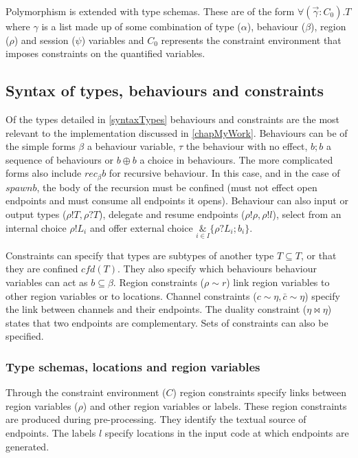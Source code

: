 Polymorphism is extended with type schemas. These are of the form $\forall(\overrightarrow{\gamma}:C_0).T$ where $\gamma$ is a list made up of some combination of type ($\alpha$), behaviour ($\beta$), region ($\rho$) and session ($\psi$) variables and $C_0$ represents the constraint environment that imposes constraints on the quantified variables. 

\subsection{Syntax of types, behaviours and constraints}

Of the types detailed in \ref{syntaxTypes} behaviours and constraints are the most relevant to the implementation discussed in \ref{chapMyWork}. Behaviours can be of the simple forms $\beta$ a behaviour variable, $\tau$ the behaviour with no effect, $b;b$ a sequence of behaviours or $b \oplus b$ a choice in behaviours. The more complicated forms also include $rec_\beta b$ for recursive behaviour. In this case, and in the case of $spawn b$, the body of the recursion must be confined (must not effect open endpoints and must consume all endpoints it opens). Behaviour can also input or output types ($\rho!T, \rho?T$), delegate and resume endpoints ($\rho!\rho, \rho!l$), select from an internal choice $\rho ! L_i$ and offer external choice $\underset{i \in I}{\&}\{\rho?L_i ; b_i\}$.

Constraints can specify that types are subtypes of another type $T\subseteq T$, or that they are confined $cfd(T)$. They also specify which behaviours behaviour variables can act as $b\subseteq \beta$. Region constraints ($\rho \sim r$) link region variables to other region variables or to locations. Channel constraints ($c\sim\eta, \bar{c}\sim\eta$) specify the link between channels and their endpoints. The duality constraint ($\eta \bowtie \eta$) states that two endpoints are complementary. Sets of constraints can also be specified. 


\subsubsection{Type schemas, locations and region variables}

Through the constraint environment ($C$) region constraints specify links between region variables ($\rho$) and other region variables or labels. These region constraints are produced during pre-processing. They identify the textual source of endpoints. The labels $l$ specify locations in the input code at which endpoints are generated.

